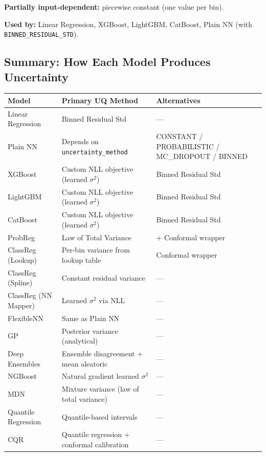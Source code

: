 \documentclass[11pt,a4paper]{article}
\theoremstyle{definition}
\begin{document}
\textbf{Partially input-dependent:} piecewise constant (one value per bin).

\textbf{Used by:} Linear Regression, XGBoost, LightGBM, CatBoost, Plain NN
(with \texttt{BINNED\_RESIDUAL\_STD}).

\subsection{Summary: How Each Model Produces Uncertainty}

\begin{center}
\renewcommand{\arraystretch}{1.3}
\footnotesize
\begin{tabular}{lll}
\toprule
\textbf{Model} & \textbf{Primary UQ Method} & \textbf{Alternatives} \\
\midrule
Linear Regression & Binned Residual Std & --- \\
Plain NN & Depends on \texttt{uncertainty\_method} & CONSTANT / PROBABILISTIC / MC\_DROPOUT / BINNED \\
XGBoost & Custom NLL objective (learned $\sigma^2$) & Binned Residual Std \\
LightGBM & Custom NLL objective (learned $\sigma^2$) & Binned Residual Std \\
CatBoost & Custom NLL objective (learned $\sigma^2$) & Binned Residual Std \\
ProbReg & Law of Total Variance & + Conformal wrapper \\
ClassReg (Lookup) & Per-bin variance from lookup table & Conformal wrapper \\
ClassReg (Spline) & Constant residual variance & --- \\
ClassReg (NN Mapper) & Learned $\sigma^2$ via NLL & --- \\
FlexibleNN & Same as Plain NN & --- \\
GP & Posterior variance (analytical) & --- \\
Deep Ensembles & Ensemble disagreement + mean aleatoric & --- \\
NGBoost & Natural gradient learned $\sigma^2$ & --- \\
MDN & Mixture variance (law of total variance) & --- \\
Quantile Regression & Quantile-based intervals & --- \\
CQR & Quantile regression + conformal calibration & --- \\
\bottomrule
\end{tabular}
\end{center}
\end{document}
